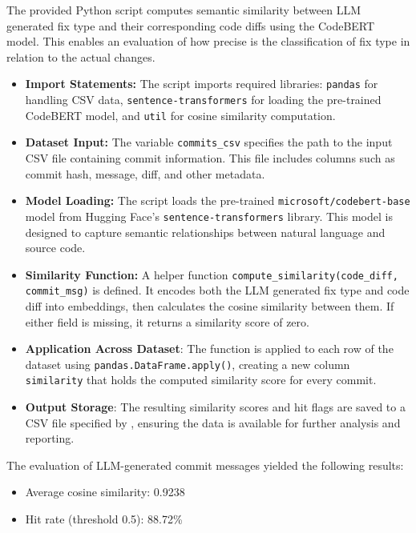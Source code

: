 \documentclass[12pt, a4paper]{report}
\begin{document}
The provided Python script computes semantic similarity between LLM generated fix type and their corresponding code diffs using the CodeBERT model. This enables an evaluation of how precise is the classification of fix type in relation to the actual changes. 

\begin{itemize}
    \item \textbf{Import Statements:} The script imports required libraries: \texttt{pandas} for handling CSV data, \texttt{sentence-transformers} for loading the pre-trained CodeBERT model, and \texttt{util} for cosine similarity computation.
    \item \textbf{Dataset Input:} The variable \texttt{commits\_csv} specifies the path to the input CSV file containing commit information. This file includes columns such as commit hash, message, diff, and other metadata.
    \item \textbf{Model Loading:} The script loads the pre-trained \texttt{microsoft/codebert-base} model from Hugging Face’s \texttt{sentence-transformers} library. This model is designed to capture semantic relationships between natural language and source code.
    \item \textbf{Similarity Function:} A helper function \texttt{compute\_similarity(code\_diff, commit\_msg)} is defined. It encodes both the LLM generated fix type and code diff into embeddings, then calculates the cosine similarity between them. If either field is missing, it returns a similarity score of zero.
    \item \textbf{Application Across Dataset}: The function is applied to each row of the dataset using \texttt{pandas.DataFrame.apply()}, creating a new column \texttt{similarity} that holds the computed similarity score for every commit.
    \item \textbf{Output Storage}: The resulting similarity scores and hit flags are saved to a CSV file specified by \texttt{}, ensuring the data is available for further analysis and reporting.
\end{itemize}

The evaluation of LLM-generated commit messages yielded the following results:

\begin{itemize}
    \item Average cosine similarity: 0.9238
    \item Hit rate (threshold 0.5): 88.72\%
\end{itemize}
\end{document}
